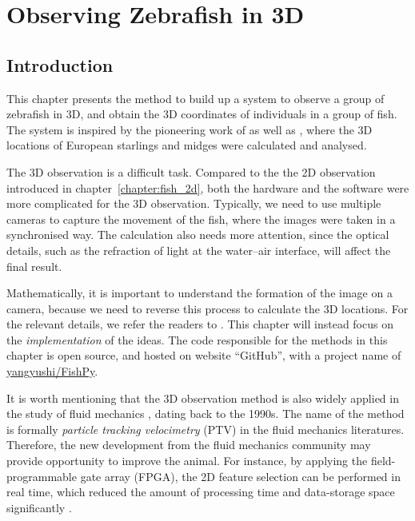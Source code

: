 \documentclass[11pt,twoside]{report}
\begin{document}
\chapter{Observing Zebrafish in 3D}
\label{chapter:fish_3d}


\section{Introduction}

This chapter presents the method to build up a system to observe a group of zebrafish in 3D, and obtain the 3D coordinates of individuals in a group of fish. The system is inspired by the pioneering work of \citeauthor{cavagna2008} \cite{cavagna2008} as well as \citeauthor{kelley2013} \cite{kelley2013}, where the 3D locations of European starlings and midges were calculated and analysed. 


The 3D observation is a difficult task. Compared to the the 2D observation introduced in chapter~\ref{chapter:fish_2d}, both the hardware and the software were more complicated for the 3D observation. Typically, we need to use multiple cameras to capture the movement of the fish, where the images were taken in a synchronised way. The calculation also needs more attention, since the optical details, such as the refraction of light at the water--air interface, will affect the final result.


Mathematically, it is important to understand the formation of the image on a camera, because we need to reverse this process to calculate the 3D locations.
For the relevant details, we refer the readers to \cite{hartley2003, ma2005}.
This chapter will instead focus on the \emph{implementation} of the ideas.
The code responsible for the methods in this chapter is open source, and hosted on website ``GitHub'', with a project name of \href{https://github.com/yangyushi/FishPy}{yangyushi/FishPy}.


It is worth mentioning that the 3D observation method is also widely applied in the study of fluid mechanics \cite{maas1993}, dating back to the 1990s. The name of the method is formally \emph{particle tracking velocimetry}
(PTV) in the fluid mechanics literatures. Therefore, the new development from the fluid mechanics community may provide opportunity to improve the animal. For instance, by applying the field-programmable gate array (\gls{FPGA}), the 2D feature selection can be performed in real time, which reduced the amount of processing time and data-storage space significantly \cite{chan2007}. 
\end{document}

